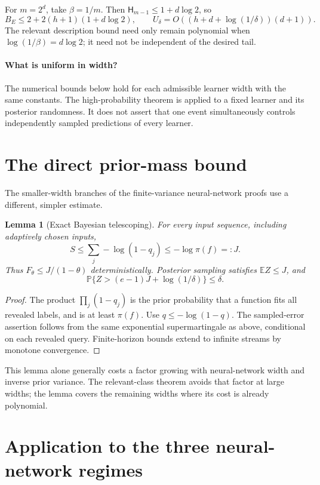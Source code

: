\documentclass[11pt]{article}
\newtheorem{lemma}[theorem]{Lemma}
\theoremstyle{remark}\newtheorem{remark}[theorem]{Remark}
\newcommand{\E}{\mathbb E}\newcommand{\Pp}{\mathbb P}
\newcommand{\HH}{\mathsf H}
\begin{document}
For $m=2^d$, take $\beta=1/m$. Then $\HH_{m-1}\le1+d\log2$, so
\begin{equation}\label{eq:polynomial-overhead}
 B_E\le2+2(h+1)(1+d\log2),\qquad
 U_\delta=O((h+d+\log(1/\delta))(d+1)).
\end{equation}
The relevant description bound need only remain polynomial when
$\log(1/\beta)=d\log2$; it need not be independent of the desired tail.

\paragraph{What is uniform in width?}
The numerical bounds below hold for each admissible learner width with
the same constants. The high-probability theorem is applied to a fixed
learner and its posterior randomness. It does not assert that one event
simultaneously controls independently sampled predictions of every learner.

\section{The direct prior-mass bound}

The smaller-width branches of the finite-variance neural-network proofs
use a different, simpler estimate.

\begin{lemma}[Exact Bayesian telescoping]\label{lem:telescoping}
For every input sequence, including adaptively chosen inputs,
\[
 S\le\sum_j-\log(1-q_j)\le-\log\pi(f)=:J.
\]
Thus $F_\theta\le J/(1-\theta)$ deterministically. Posterior sampling
satisfies $\E Z\le J$, and
\[
 \Pp\{Z>(e-1)J+\log(1/\delta)\}\le\delta.
\]
\end{lemma}
\begin{proof}
The product $\prod_j(1-q_j)$ is the prior probability that a function
fits all revealed labels, and is at least $\pi(f)$. Use
$q\le-\log(1-q)$. The sampled-error assertion follows from the same
exponential supermartingale as above, conditional on each revealed query.
Finite-horizon bounds extend to infinite streams by monotone convergence.
\end{proof}

This lemma alone generally costs a factor growing with neural-network
width and inverse prior variance. The relevant-class theorem avoids that
factor at large widths; the lemma covers the remaining widths where its
cost is already polynomial.

\section{Application to the three neural-network regimes}\label{sec:neural}
\end{document}
